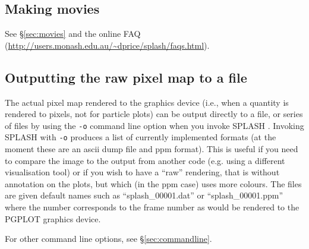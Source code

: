 \documentclass[a4paper,10pt]{article}
\newcommand{\splash}{\textsc{SPLASH }}
\begin{document}
\subsection{Making movies}
See \S\ref{sec:movies} and the online FAQ (\url{http://users.monash.edu.au/~dprice/splash/faqs.html}).

\subsection{Outputting the raw pixel map to a file}
\label{sec:writepixmap}
 The actual pixel map rendered to the graphics device (i.e., when a quantity is rendered to pixels, not for particle plots) can be output directly to a file, or series of files by using the \verb+-o+ command line option when you invoke \splash. Invoking \splash with \verb+-o+ produces a list of currently implemented formats (at the moment these are an ascii dump file and ppm format). This is useful if you need to compare the image to the output from another code (e.g. using a different visualisation tool) or if you wish to have a ``raw'' rendering, that is without annotation on the plots, but which (in the ppm case) uses more colours. The files are given default names such as ``splash\_00001.dat'' or ``splash\_00001.ppm'' where the number corresponds to the frame number as would be rendered to the PGPLOT graphics device.
 
  For other command line options, see \S\ref{sec:commandline}.
\end{document}
